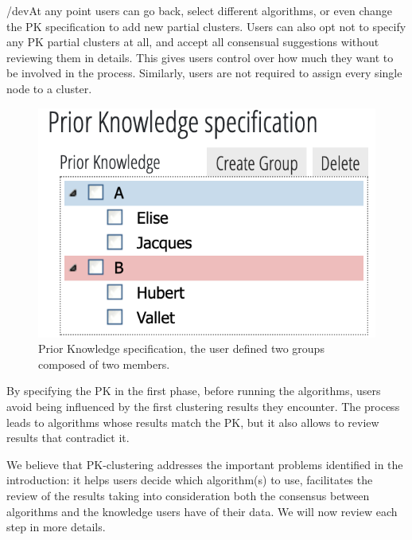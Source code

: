 /dev{At any point users can go back, select different algorithms, or even change the PK specification to add new partial clusters.  Users can also opt not to specify any PK partial clusters at all, and accept all consensual suggestions without reviewing them in details. This gives users control over how much they want to be involved in the process. Similarly, users are not required to assign every single node to a cluster.}

\begin{figure}
\includegraphics[trim=15 10 10 10,width=\linewidth]{static/figures/PK-Clustering/VISPaperFigures/Small-PK_specification}
\caption{Prior Knowledge specification, the user defined two groups composed of two members.}%
\label{fig:PK-Small-PK_specification}
\end{figure}
By specifying the PK in the first phase, before running the algorithms, users avoid being influenced by the first clustering results they encounter.  The process leads to algorithms whose results match the PK, but it also allows to review results that contradict it.


We believe that PK-clustering addresses the important problems identified in the introduction: it helps users decide which algorithm(s) to use, facilitates the review of the results taking into consideration both the consensus between algorithms and the knowledge users have of their data.
We will now review each step in more details.




